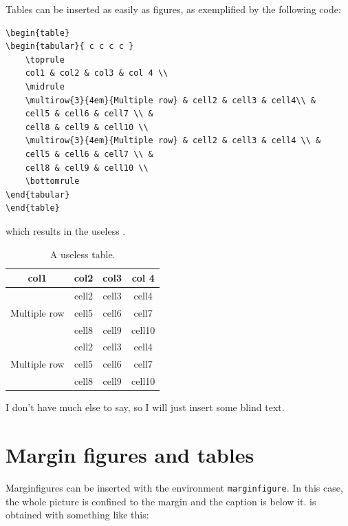Tables can be inserted as easily as figures, as exemplified by the 
following code:

\begin{lstlisting}
\begin{table}
\begin{tabular}{ c c c c }
	\toprule
	col1 & col2 & col3 & col 4 \\
	\midrule
	\multirow{3}{4em}{Multiple row} & cell2 & cell3 & cell4\\ &
	cell5 & cell6 & cell7 \\ &
	cell8 & cell9 & cell10 \\
	\multirow{3}{4em}{Multiple row} & cell2 & cell3 & cell4 \\ &
	cell5 & cell6 & cell7 \\ &
	cell8 & cell9 & cell10 \\
	\bottomrule
\end{tabular}
\end{table}
\end{lstlisting}

which results in the useless .

\begin{table}[b]
\caption[A useless table]{A useless table.}
\begin{tabular}{ c c c c }
	\toprule
	col1 & col2 & col3 & col 4 \\
	\midrule
	\multirow{3}{4em}{Multiple row} & cell2 & cell3 & cell4\\ &
	cell5 & cell6 & cell7 \\ &
	cell8 & cell9 & cell10 \\
	\multirow{3}{4em}{Multiple row} & cell2 & cell3 & cell4 \\ &
	cell5 & cell6 & cell7 \\ &
	cell8 & cell9 & cell10 \\
	\bottomrule
\end{tabular}
\end{table}

I don't have much else to say, so I will just insert some blind text. 
\blindtext

\section{Margin figures and tables}

Marginfigures can be inserted with the environment \verb|marginfigure|. 
In this case, the whole picture is confined to the margin and the 
caption is below it.  is obtained with something 
like this:


